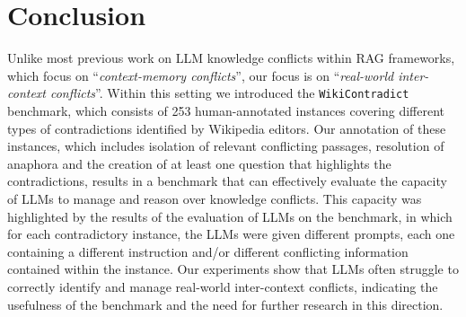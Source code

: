 \section{Conclusion}
\label{sec:conc}

Unlike most previous work on LLM knowledge conflicts within RAG frameworks, which focus on ``\emph{context-memory conflicts}'', our focus is on ``\emph{real-world inter-context conflicts}''. Within this setting we introduced the \texttt{WikiContradict} benchmark, which consists of 253 human-annotated instances covering different types of contradictions identified by Wikipedia editors. Our annotation of these instances, which includes isolation of relevant conflicting passages, resolution of anaphora and the creation of at least one question that highlights the contradictions, results in a benchmark that can effectively evaluate the capacity of LLMs to manage and reason over knowledge conflicts. This capacity was highlighted by the results of the evaluation of LLMs on the benchmark, in which for each contradictory instance, the LLMs were given different prompts, each one containing a different instruction and/or different conflicting information contained within the instance. Our experiments show that LLMs often struggle to correctly identify and manage real-world inter-context conflicts, indicating the usefulness of the benchmark and the need for further research in this direction. 
